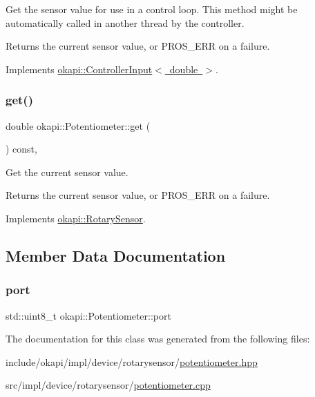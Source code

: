 Get the sensor value for use in a control loop. This method might be automatically called in another thread by the controller.

\begin{DoxyReturn}{Returns}
the current sensor value, or {\ttfamily P\+R\+O\+S\+\_\+\+E\+RR} on a failure. 
\end{DoxyReturn}


Implements \mbox{\hyperlink{classokapi_1_1ControllerInput_a3c6c86d897983f367928a93890551e17}{okapi\+::\+Controller\+Input$<$ double $>$}}.

\mbox{\label{classokapi_1_1Potentiometer_ad81adf2cb10b830272e9a553b668fc4b}} 
\subsubsection{\texorpdfstring{get()}{get()}}
{\footnotesize\ttfamily double okapi\+::\+Potentiometer\+::get (\begin{DoxyParamCaption}{ }\end{DoxyParamCaption}) const\hspace{0.3cm}{\ttfamily [override]}, {\ttfamily [virtual]}}

Get the current sensor value.

\begin{DoxyReturn}{Returns}
the current sensor value, or {\ttfamily P\+R\+O\+S\+\_\+\+E\+RR} on a failure. 
\end{DoxyReturn}


Implements \mbox{\hyperlink{classokapi_1_1RotarySensor_ac5534dc6c3bcbd8ea2f4e54a04cda734}{okapi\+::\+Rotary\+Sensor}}.



\subsection{Member Data Documentation}
\mbox{\label{classokapi_1_1Potentiometer_ade12a9942bf6fd83f43e38f22ed210d3}} 
\subsubsection{\texorpdfstring{port}{port}}
{\footnotesize\ttfamily std\+::uint8\+\_\+t okapi\+::\+Potentiometer\+::port\hspace{0.3cm}{\ttfamily [protected]}}



The documentation for this class was generated from the following files\+:\begin{DoxyCompactItemize}
\item 
include/okapi/impl/device/rotarysensor/\mbox{\hyperlink{potentiometer_8hpp}{potentiometer.\+hpp}}\item 
src/impl/device/rotarysensor/\mbox{\hyperlink{potentiometer_8cpp}{potentiometer.\+cpp}}\end{DoxyCompactItemize}
